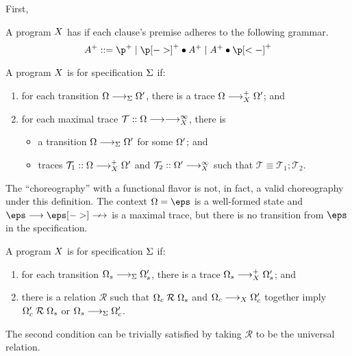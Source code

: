 First, 

\begin{definition}[Locality]
  A program $X$ has  if each clause's premise adheres to the following grammar.
  \begin{equation*}
    A^+ ::= \p^+ \mid \p[->]^+ \fuse A^+ \mid A^+ \fuse \p[<-]^+
  \end{equation*}
\end{definition}

\begin{definition}
  A program $X$ is  for specification $\Sigma$ if:
  \begin{enumerate}
  \item\label{def:spec-pres-1}
    for each transition $\octx \trans_{\spec} \octx'$,
    there is a trace $\octx \trans+_{\chor} \octx'$; and
  \item\label{def:spec-pres-2}
    for each maximal trace $\mathcal{T} :: \octx \trans\trans[\infty]_{\chor}$, there is
    \begin{itemize}
    \item a transition $\octx \trans_{\spec} \octx'$ for some $\Omega'$; and
    \item traces $\mathcal{T}_1 :: \octx \trans+_{\chor} \octx'$ and
      $\mathcal{T}_2 :: \octx' \trans[\infty]_{\chor}$ such that
      $\mathcal{T} \equiv \mathcal{T}_1; \mathcal{T}_2$.
    \end{itemize}
  \end{enumerate}
\end{definition}



The \enquote{choreography} with a functional flavor is not, in fact, a valid choreography under this definition.
The context $\octx = \eps$ is a well-formed state and $\eps \trans \eps[->] \ntrans$ is a maximal trace, but there is no transition from $\eps$ in the specification.



\begin{definition}
  A program $X$ is  for specification $\Sigma$ if:
  \begin{enumerate}
  \item\label{def:spec-pres-1}
    for each transition $\octx_s \trans_{\spec} \octx'_s$,
    there is a trace $\octx_s \trans+_{\chor} \octx'_s$; and
  \item\label{def:spec-pres-2}
    there is a relation $\mathrel{\mathcal{R}}$ such that $\Omega_c \mathrel{\mathcal{R}} \Omega_s$ and $\octx_c \trans_{\chor} \octx'_c$ together imply $\Omega'_c \mathrel{\mathcal{R}} \Omega_s$ or $\octx_s \trans_{\spec} \octx'_c$.
  \end{enumerate}
\end{definition}
\noindent
The second condition can be trivially satisfied by taking $\mathrel{\mathcal{R}}$ to be the universal relation.


